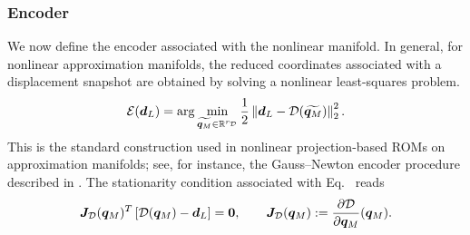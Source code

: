 \documentclass[11pt,a4paper]{article}
\newcommand{\PROMPT}[1]{ }
\begin{document}
\PROMPT{}

%

\PROMPT{}

%
\PROMPT{}

\subsubsection{Encoder}
\label{subsubsec:encoder_manifold}

We now define the encoder associated with the nonlinear manifold. In general,
for nonlinear approximation manifolds, the reduced coordinates associated with
a displacement snapshot are obtained by solving a nonlinear least-squares
problem.
\begin{equation}
\label{eq:encoder_nonlinear_LS}
    \mathcal{\boldsymbol{E}}(\bm{d}_L)
    =
    \arg\min_{\widetilde{\bm{q}_M}\in\mathbb{R}^{r_{\mathcal{D}}}}
    \frac{1}{2}
    \left\|
    \bm{d}_L-\mathcal{\boldsymbol{D}}(\widetilde{\bm{q}_M})
    \right\|_2^2 .
\end{equation}
This is the standard construction used in nonlinear projection-based ROMs on
approximation manifolds; see, for instance, the Gauss--Newton encoder
procedure described in \cite{ares2026nonlinear}. The stationarity condition
associated with Eq.~ reads
\begin{equation}
\label{eq:encoder_normal_equation}
    \bm{J}_{\mathcal{D}}(\bm{q}_M)^T
    \left[
    \mathcal{\boldsymbol{D}}(\bm{q}_M)-\bm{d}_L
    \right]
    =
    \bm{0},
    \qquad
    \bm{J}_{\mathcal{D}}(\bm{q}_M):=
    \dfrac{\partial \mathcal{\boldsymbol{D}}}{\partial \bm{q}_M}(\bm{q}_M).
\end{equation}
\end{document}
